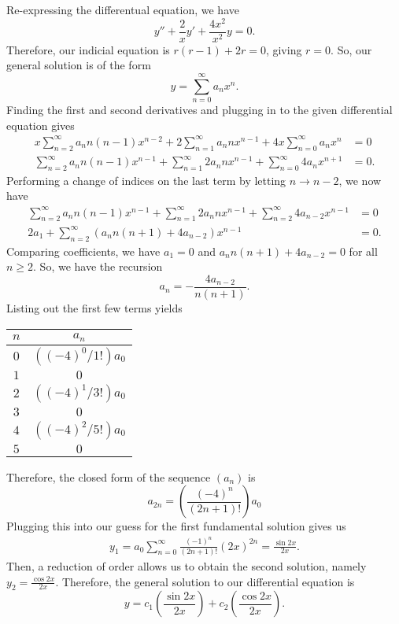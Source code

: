 \begin{soln}
    Re-expressing the differentual equation, we have
    $$y'' + \frac{2}{x}y' + \frac{4x^2}{x^2}y = 0.$$
    Therefore, our indicial equation is $r(r-1)+2r=0$, giving $r=0$. So, our
    general solution is of the form
    $$y = \sum_{n = 0}^{\infty} a_n x^n.$$ Finding the first and second derivatives
    and plugging in to the given differential equation gives
    \begin{align*}
        x\sum_{n = 2}^{\infty} a_n n (n-1)x^{n-2} + 2\sum_{n = 1}^{\infty} a_n n x^{n-1}
        + 4x \sum_{n = 0}^{\infty} a_n x^n &= 0 \\
        \sum_{n = 2}^{\infty} a_n n (n-1)x^{n-1} + \sum_{n = 1}^{\infty} 2a_n n x^{n-1}
        +  \sum_{n = 0}^{\infty}4 a_n x^{n+1} &= 0.
    \end{align*}
    Performing a change of indices on the last term by letting $n \rightarrow n-2$,
    we now have
    \begin{align*}
        \sum_{n = 2}^{\infty} a_n n (n-1)x^{n-1} + \sum_{n = 1}^{\infty} 2a_n n x^{n-1}
        +  \sum_{n = 2}^{\infty}4 a_{n-2} x^{n-1} &= 0 \\
        2a_1 + \sum_{n = 2}^{\infty} \left(a_n n (n+1)+4a_{n-2}  \right)x^{n-1} &= 0.
    \end{align*}
    Comparing coefficients, we have $a_1 = 0$ and $a_n n (n+1) + 4a_{n-2} = 0$ for
    all $n \geq 2$. So, we have the recursion $$a_n = -\frac{4a_{n-2}}{n(n+1)}.$$
    Listing out the first few terms yields
    \begin{center}
        \begin{tabular}{| c | c |}
            \hline
            $n$ & $a_n$ \\
            \hline
            $0$ & $((-4)^0/1!)a_0$ \\
            $1$ & $0$ \\
            $2$ & $((-4)^1/3!)a_0$ \\
            $3$ & $0$ \\
            $4$ & $((-4)^2/5!)a_0$ \\
            $5$ & $0$ \\
            \hline
        \end{tabular}
    \end{center}
    Therefore, the closed form of the sequence $(a_n)$ is 
    $$a_{2n} = \left(\frac{(-4)^n}{(2n+1)!}\right)a_0$$
    Plugging this into our guess for the first fundamental solution gives us
    \begin{align*}
        y_1 = a_0\sum_{n = 0}^{\infty} \frac{(-1)^n}{(2n+1)!}(2x)^{2n} = \frac{\sin 2x}{2x}.
    \end{align*}
    Then, a reduction of order allows us to obtain the second solution, namely
    $y_2 = \frac{\cos 2x}{2x}$. Therefore, the general solution to our differential
    equation is $$y = c_1\left(\frac{\sin 2x}{2x}\right)+c_2\left(\frac{\cos 2x}{2x}\right).$$
\end{soln}
